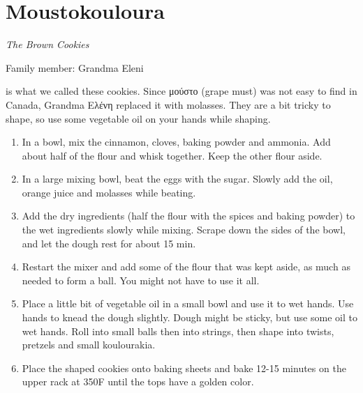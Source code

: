 \chapter{Moustokouloura}
\label{ch:moustokouloura}


\textit{The Brown Cookies}

Family member: Grandma Eleni

 is what we called these cookies. Since \textgreek{μούστο} (grape must) was not easy to find in Canada, Grandma \textgreek{Ελένη} replaced it with molasses. They are a bit tricky to shape, so use some vegetable oil on your hands while shaping.

\begin{enumerate}
    \item In a bowl, mix the cinnamon, cloves, baking powder and ammonia. Add about half of the flour and whisk together. Keep the other flour aside.
    \item In a large mixing bowl, beat the eggs with the sugar. Slowly add the oil, orange juice and molasses while beating.
    \item Add the dry ingredients (half the flour with the spices and baking powder) to the wet ingredients slowly while mixing. Scrape down the sides of the bowl, and let the dough rest for about 15 min.
    \item Restart the mixer and add some of the flour that was kept aside, as much as needed to form a ball. You might not have to use it all.
    \item Place a little bit of vegetable oil in a small bowl and use it to wet hands. Use hands to knead the dough slightly. Dough might be sticky, but use some oil to wet hands. Roll into small balls then into strings, then shape into twists, pretzels and small koulourakia.
    \item Place the shaped cookies onto baking sheets and bake 12-15 minutes on the upper rack at 350\degree F until the tops have a golden color.
\end{enumerate}

